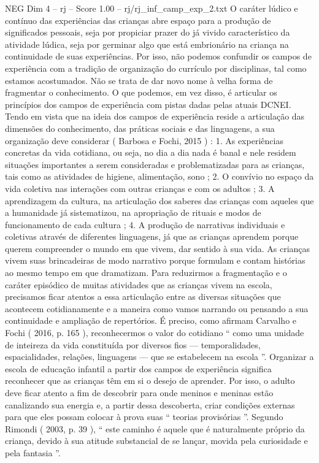 \begin{textsample}{NEG Dim 4 – rj – Score 1.00 – rj/rj\_inf\_camp\_exp\_2.txt}  \label{ex:f4_neg_128}
O caráter lúdico e contínuo das experiências das crianças abre espaço para a produção de significados pessoais, seja por propiciar prazer do já vivido característico da atividade lúdica, seja por germinar algo que está embrionário na criança na continuidade de suas experiências.
Por isso, não podemos confundir os campos de experiência com a tradição de organização do currículo por disciplinas, tal como estamos acostumados.
Não se trata de dar novo nome à velha forma de fragmentar o conhecimento.
O que podemos, em vez disso, é articular os princípios dos campos de experiência com pistas dadas pelas atuais DCNEI.
Tendo em vista que na ideia dos campos de experiência reside a articulação das dimensões do conhecimento, das práticas sociais e das linguagens, a sua organização deve considerar ( Barbosa e Fochi, 2015 ) : 1.
As experiências concretas da vida cotidiana, ou seja, no dia a dia nada é banal e nele residem situações importantes a serem consideradas e problematizadas para as crianças, tais como as atividades de higiene, alimentação, sono ; 2.
O convívio no espaço da vida coletiva nas interações com outras crianças e com os adultos ; 3.
A aprendizagem da cultura, na articulação dos saberes das crianças com aqueles que a humanidade já sistematizou, na apropriação de rituais e modos de funcionamento de cada cultura ; 4.
A produção de narrativas individuais e coletivas através de diferentes linguagens, já que as crianças aprendem porque querem compreender o mundo em que vivem, dar sentido à sua vida.
As crianças vivem suas brincadeiras de modo narrativo porque formulam e contam histórias ao mesmo tempo em que dramatizam.
Para reduzirmos a fragmentação e o caráter episódico de muitas atividades que as crianças vivem na escola, precisamos ficar atentos a essa articulação entre as diversas situações que acontecem cotidianamente e a maneira como vamos narrando ou pensando a sua continuidade e ampliação de repertórios.
É preciso, como afirmam Carvalho e Fochi ( 2016, p. 165 ), reconhecermos o valor do cotidiano “ como uma unidade de inteireza da vida constituída por diversos fios — temporalidades, espacialidades, relações, linguagens — que se estabelecem na escola ”.
Organizar a escola de educação infantil a partir dos campos de experiência significa reconhecer que as crianças têm em si o desejo de aprender.
Por isso, o adulto deve ficar atento a fim de descobrir para onde meninos e meninas estão canalizando sua energia e, a partir dessa descoberta, criar condições externas para que eles possam colocar à prova suas “ teorias provisórias ”.
Segundo Rimondi ( 2003, p. 39 ), “ este caminho é aquele que é naturalmente próprio da criança, devido à sua atitude substancial de se lançar, movida pela curiosidade e pela fantasia ”.

\end{textsample}
